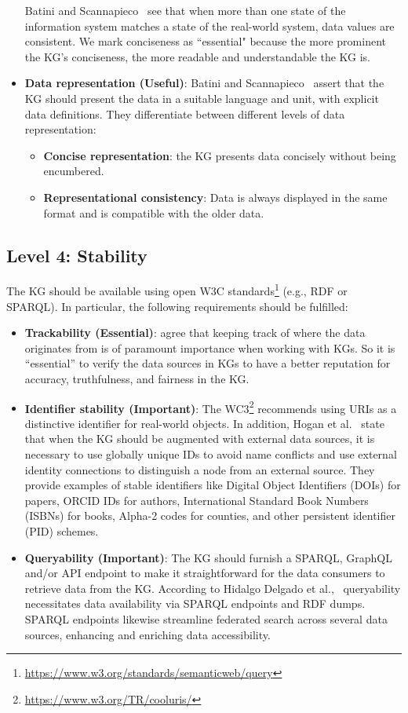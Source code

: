\documentclass[runningheads]{llncs}
\begin{document}
\begin{itemize}
Batini and Scannapieco~\cite{Batinidata2006} see that when more than one state of the information system matches a state of the real-world system, data values are consistent. 
We mark conciseness as ``essential" because the more prominent the KG's conciseness, the more readable and understandable the KG is.%
\item \textbf {Data representation (Useful)}:
\label{subsec:dataRepresentation}
Batini and Scannapieco~\cite{Batinidata2006} assert that the KG should present the data in a suitable language and unit, with explicit data definitions. They differentiate between different levels of data representation:
\begin{itemize}
    \item \textbf{Concise representation}: the KG presents data concisely without being encumbered.
    \item \textbf{Representational consistency}: Data is always displayed in the same format and is compatible with the older data.
\end{itemize}
\end{itemize}
\subsection{Level 4: Stability}
The KG should be available using open W3C standards\footnote{\url{https://www.w3.org/standards/semanticweb/query}} (e.g., RDF or SPARQL). In particular, the following requirements should be fulfilled:
\begin{itemize}
  \item \textbf{Trackability (Essential)}: \cite{bonatti_robust_2011,dividino_querying_2009,K-Automorphism} agree that keeping track of where the data originates from is of paramount importance when working with KGs. So it is ``essential” to verify the data sources in KGs to have a better reputation for accuracy, truthfulness, and fairness in the KG.
  \item \textbf {Identifier stability (Important)}: 
  The WC3\footnote{\url{https://www.w3.org/TR/cooluris/}} recommends using URIs as a distinctive identifier for real-world objects. In addition, Hogan et al.~\cite{hogan_knowledge_2022} state that when the KG should be augmented with external data sources, it is necessary to use globally unique IDs to avoid name conflicts and use external identity connections to distinguish a node from an external source. They provide examples of stable identifiers like Digital Object Identifiers (DOIs) for papers, ORCID IDs for authors, International Standard Book Numbers (ISBNs) for books, Alpha-2 codes for counties, and other persistent identifier (PID) schemes.
  \item \textbf {Queryability (Important)}: 
  The KG should furnish a SPARQL, GraphQL and/or API endpoint to make it straightforward for the data consumers to retrieve data from the KG.
  According to Hidalgo Delgado et al.,~\cite{Hidalgo-Delgado_quality_2021} queryability necessitates data availability via SPARQL endpoints and RDF dumps.
  SPARQL endpoints likewise streamline federated search across several data sources, enhancing and enriching data accessibility.
\end{itemize}
\end{document}
